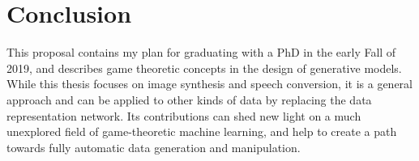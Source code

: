 \documentclass{article}
\begin{document}



\section{Conclusion}
\label{Sec:Con}

This proposal contains my plan for graduating with a PhD in the early Fall of 2019, and describes game theoretic concepts in the design of generative models. While this thesis focuses on image synthesis and speech conversion, it is a general approach and can be applied to other kinds of data by replacing the data representation network. Its contributions can shed new light on a much unexplored field of game-theoretic machine learning, and help to create a path towards fully automatic data generation and manipulation.


\end{document}
